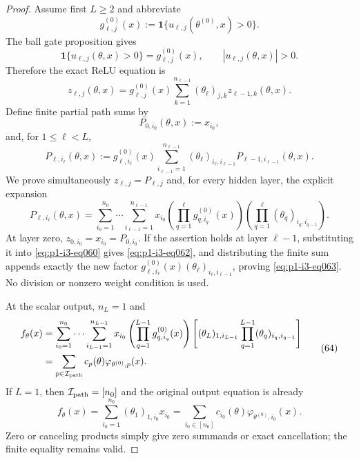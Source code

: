 \begin{proof}
Assume first $L\geq2$ and abbreviate
\[
g_{\ell,j}^{(0)}(x):=\mathbf1\{u_{\ell,j}(\theta^{(0)},x)>0\}.
\tag{58}\label{eq:p1-i3-eq058}
\]
The ball gate proposition gives
\[
\mathbf1\{u_{\ell,j}(\theta,x)>0\}=g_{\ell,j}^{(0)}(x),
\qquad |u_{\ell,j}(\theta,x)|>0.
\tag{59}\label{eq:p1-i3-eq059}
\]
Therefore the exact ReLU equation is
\[
z_{\ell,j}(\theta,x)=g_{\ell,j}^{(0)}(x)
\sum_{k=1}^{n_{\ell-1}}(\theta_\ell)_{j,k}
z_{\ell-1,k}(\theta,x).
\tag{60}\label{eq:p1-i3-eq060}
\]
Define finite partial path sums by
\[
P_{0,i_0}(\theta,x):=x_{i_0},
\tag{61}\label{eq:p1-i3-eq061}
\]
and, for $1\leq\ell<L$,
\[
P_{\ell,i_\ell}(\theta,x):=g_{\ell,i_\ell}^{(0)}(x)
\sum_{i_{\ell-1}=1}^{n_{\ell-1}}
(\theta_\ell)_{i_\ell,i_{\ell-1}}
P_{\ell-1,i_{\ell-1}}(\theta,x).
\tag{62}\label{eq:p1-i3-eq062}
\]
We prove simultaneously $z_{\ell,j}=P_{\ell,j}$ and, for every hidden
layer, the explicit expansion
\[
P_{\ell,i_\ell}(\theta,x)=
\sum_{i_0=1}^{n_0}\cdots\sum_{i_{\ell-1}=1}^{n_{\ell-1}}
x_{i_0}
\left(\prod_{q=1}^{\ell}g_{q,i_q}^{(0)}(x)\right)
\left(\prod_{q=1}^{\ell}(\theta_q)_{i_q,i_{q-1}}\right).
\tag{63}\label{eq:p1-i3-eq063}
\]
At layer zero, $z_{0,i_0}=x_{i_0}=P_{0,i_0}$.  If the assertion holds at
layer $\ell-1$, substituting it into \eqref{eq:p1-i3-eq060} gives \eqref{eq:p1-i3-eq062}, and distributing the
finite sum appends exactly the new factor
$g_{\ell,i_\ell}^{(0)}(x)(\theta_\ell)_{i_\ell,i_{\ell-1}}$, proving \eqref{eq:p1-i3-eq063}.
No division or nonzero weight condition is used.

At the scalar output, $n_L=1$ and
\[
\begin{aligned}
f_\theta(x)
&=\sum_{i_0=1}^{n_0}\cdots\sum_{i_{L-1}=1}^{n_{L-1}}
x_{i_0}\left(\prod_{q=1}^{L-1}g_{q,i_q}^{(0)}(x)\right)
\left[(\theta_L)_{1,i_{L-1}}
\prod_{q=1}^{L-1}(\theta_q)_{i_q,i_{q-1}}\right]\\
&=\sum_{p\in\mathcal I_{\rm path}}c_p(\theta)
\varphi_{\theta^{(0)},p}(x).
\end{aligned}
\tag{64}\label{eq:p1-i3-eq064}
\]
If $L=1$, then $\mathcal I_{\rm path}=[n_0]$ and the original output equation
is already
\[
f_\theta(x)=\sum_{i_0=1}^{n_0}(\theta_1)_{1,i_0}x_{i_0}
=\sum_{i_0\in[n_0]}c_{i_0}(\theta)
\varphi_{\theta^{(0)},i_0}(x).
\tag{65}\label{eq:p1-i3-eq065}
\]
Zero or canceling products simply give zero summands or exact cancellation;
the finite equality remains valid.
\end{proof}

